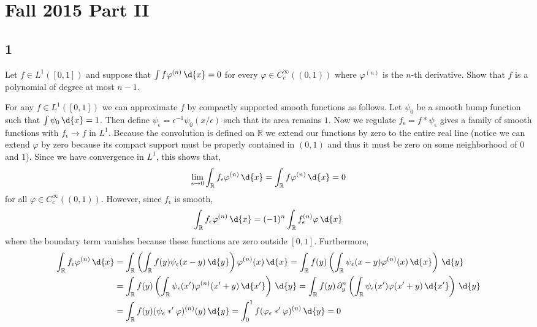 \documentclass[12pt]{article}
\newcommand{\R}{\mathbb{R}}
\begin{document}
\section{Fall 2015 Part II}

\subsection{1}

\begin{exercise}
Let $f \in L^1([0,1])$ and suppose that $\int f \varphi^{(n)} \, \d{x} = 0$ for every $\varphi \in C^{\infty}_c((0,1))$ where $\varphi^{(n)}$ is the $n$-th derivative. Show that $f$ is a polynomial of degree at most $n - 1$.
\end{exercise}

For any $f \in L^1([0,1])$ we can approximate $f$ by compactly supported smooth functions as follows. Let $\psi_0$ be a smooth bump function such that $\int \psi_0 \, \d{x} = 1$. Then define $\psi_\epsilon = \epsilon^{-1} \psi_0(x / \epsilon)$ such that its area remains $1$. Now we regulate $f_\epsilon = f * \psi_\epsilon$ gives a family of smooth functions with $f_\epsilon \to f$ in $L^1$. Because the convolution is defined on $\R$ we extend our functions by zero to the entire real line (notice we can extend $\varphi$ by zero because its compact support must be properly contained in $(0,1)$ and thus it must be zero on some neighborhood of $0$ and $1$). Since we have convergence in $L^1$, this shows that,
\[ \lim_{\epsilon \to 0} \int_\R f_\epsilon \varphi^{(n)} \, \d{x} = \int_\R f \varphi^{(n)} \, \d{x} = 0 \]
for all $\varphi \in C^\infty_c((0,1))$. However, since $f_\epsilon$ is smooth, 
\[ \int_\R f_\epsilon \varphi^{(n)} \, \d{x} = (-1)^n \int_\R f_\epsilon^{(n)} \varphi \, \d{x} \]
where the boundary term vanishes because these functions are zero outside $[0,1]$. Furthermore,
\begin{align*}
\int_\R f_\epsilon \varphi^{(n)} \, \d{x} &= \int_\R \left( \int_\R f(y) \psi_\epsilon(x - y) \, \d{y} \right) \varphi^{(n)}(x) \, \d{x} = \int_\R f(y) \left( \int_\R \psi_\epsilon(x - y) \varphi^{(n)}(x) \, \d{x} \right) \, \d{y}
\\
& = \int_\R f(y) \left( \int_\R \psi_\epsilon(x') \varphi^{(n)}(x'+y) \, \d{x'} \right) \, \d{y} = \int_\R f(y) \, \partial_y^n \left( \int_\R \psi_\epsilon(x') \varphi(x' + y) \, \d{x'} \right) \, \d{y}
\\
& = \int_\R f(y) (\psi_\epsilon *' \varphi)^{(n)}(y) \, \d{y} = \int_0^1 f (\varphi_\epsilon *' \varphi)^{(n)} \, \d{y} = 0
\end{align*}
\end{document}
